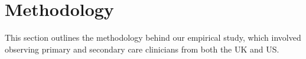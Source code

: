 \documentclass{sigchi}
\begin{document}









\section{Methodology}

This section outlines the methodology behind our empirical study, which involved observing primary and secondary care clinicians from both the UK and US.
\end{document}
